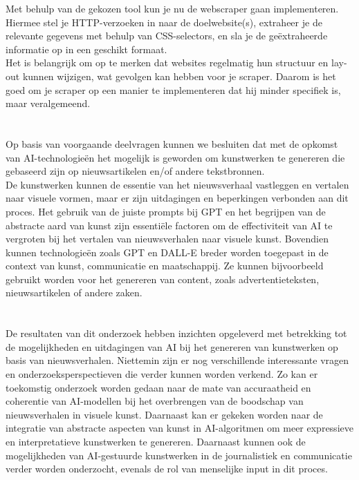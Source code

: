 Met behulp van de gekozen tool kun je nu de webscraper gaan implementeren. Hiermee stel je HTTP-verzoeken in naar de doelwebsite(s), extraheer je de relevante gegevens met behulp van CSS-selectors, en sla je de geëxtraheerde informatie op in een geschikt formaat.  \\

Het is belangrijk om op te merken dat websites regelmatig hun structuur en lay-out kunnen wijzigen, wat gevolgen kan hebben voor je scraper. Daarom is het goed om je scraper op een manier te implementeren dat hij minder specifiek is, maar veralgemeend.

\section{  }%
Op basis van voorgaande deelvragen kunnen we besluiten dat met de opkomst van AI-technologieën  het mogelijk is geworden om kunstwerken te genereren die gebaseerd zijn op nieuwsartikelen en/of andere tekstbronnen. \\

De kunstwerken kunnen de essentie van het nieuwsverhaal vastleggen en vertalen naar visuele vormen, maar er zijn uitdagingen en beperkingen verbonden aan dit proces. Het gebruik van de juiste prompts bij GPT en het begrijpen van de abstracte aard van kunst zijn essentiële factoren om de effectiviteit van AI te vergroten bij het vertalen van nieuwsverhalen naar visuele kunst. Bovendien kunnen technologieën zoals GPT en DALL-E breder worden toegepast in de context van kunst, communicatie en maatschappij. Ze kunnen bijvoorbeeld gebruikt worden voor het genereren van content, zoals advertentieteksten, nieuwsartikelen of andere zaken.


\section{  }%
De resultaten van dit onderzoek hebben inzichten opgeleverd met betrekking tot de mogelijkheden en uitdagingen van AI bij het genereren van kunstwerken op basis van nieuwsverhalen. Niettemin zijn er nog verschillende interessante vragen en onderzoeksperspectieven die verder kunnen worden verkend. Zo kan er toekomstig onderzoek worden gedaan naar de mate van accuraatheid en coherentie van AI-modellen bij het overbrengen van de boodschap van nieuwsverhalen in visuele kunst. Daarnaast kan er gekeken worden naar de integratie van abstracte aspecten van kunst in AI-algoritmen om meer expressieve en interpretatieve kunstwerken te genereren.  Daarnaast kunnen ook de mogelijkheden van AI-gestuurde kunstwerken in de journalistiek en communicatie verder worden onderzocht, evenals de rol van menselijke input in dit proces.

